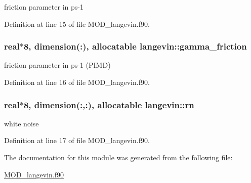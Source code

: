 friction parameter in ps-\/1 



Definition at line 15 of file M\-O\-D\-\_\-langevin.\-f90.

\hypertarget{classlangevin_a772d30ab950f2b2f9a18a5636e511ba2}{
\subsubsection[{gamma\-\_\-friction}]{\setlength{\rightskip}{0pt plus 5cm}real$\ast$8, dimension(\-:), allocatable langevin\-::gamma\-\_\-friction}}\label{classlangevin_a772d30ab950f2b2f9a18a5636e511ba2}


friction parameter in ps-\/1 (P\-I\-M\-D) 



Definition at line 16 of file M\-O\-D\-\_\-langevin.\-f90.

\hypertarget{classlangevin_add2b2e42216c6f66497043320a4a6a0f}{
\subsubsection[{rn}]{\setlength{\rightskip}{0pt plus 5cm}real$\ast$8, dimension(\-:,\-:), allocatable langevin\-::rn}}\label{classlangevin_add2b2e42216c6f66497043320a4a6a0f}


white noise 



Definition at line 17 of file M\-O\-D\-\_\-langevin.\-f90.



The documentation for this module was generated from the following file\-:\begin{DoxyCompactItemize}
\item 
\hyperlink{MOD__langevin_8f90}{M\-O\-D\-\_\-langevin.\-f90}\end{DoxyCompactItemize}

